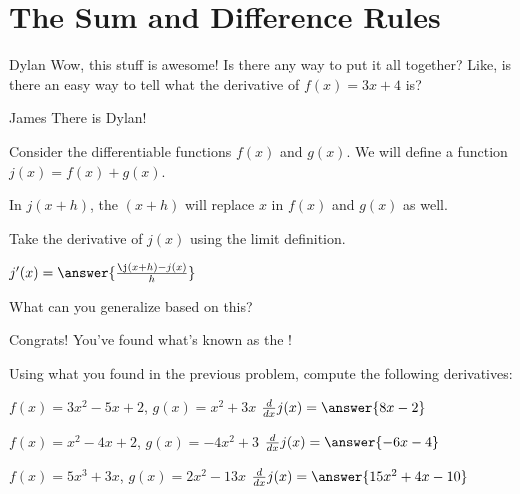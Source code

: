 \documentclass{ximera}
\begin{document}
\section{The Sum and Difference Rules}
\begin{dialogue}
\item[Dylan] Wow, this stuff is awesome! Is there any way to put it all together? Like, is there an easy way to tell what the derivative of $f(x) = 3x+4$ is?
\item[James] There is Dylan!
\end{dialogue}

\begin{question}
Consider the differentiable functions $f(x)$ and $g(x)$. We will define a function $j(x) = f(x) + g(x)$.

\begin{hint}
In $j(x+h)$, the $(x+h)$ will replace $x$ in $f(x)$ and $g(x)$ as well.
\end{hint}
Take the derivative of $j(x)$ using the limit definition.

$j'(x) =  \answer{\frac{\j(x+h)-j(x)}{h}}$

What can you generalize based on this?

\begin{multipleChoice}
\end{multipleChoice}
\begin{feedback}[correct]
Congrats! You've found what's known as the !
\end{feedback}
\end{question}
\begin{question}
Using what you found in the previous problem, compute the following derivatives:

$f(x) = 3x^2 - 5x + 2$, $g(x) = x^2 + 3x$ \hspace{11mm} $\frac{d}{dx}j(x) =  \answer{8x-2}$

$f(x) = x^2 - 4x + 2$, $g(x) = -4x^2 + 3$ \hspace{10mm} $\frac{d}{dx}j(x) = \answer{-6x-4}$

$f(x) = 5x^3 + 3x$, $g(x) = 2x^2 - 13x$ \hspace{13mm} $\frac{d}{dx}j(x) =  \answer{15x^2+4x-10}$
\end{question}
\end{document}
